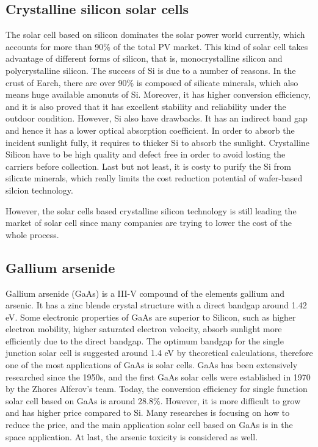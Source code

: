 \documentclass[a4paper, 12pt, titlepage,oneside,drop]{kthesis}
\begin{document}
\subsection{Crystalline silicon solar cells}
The solar cell based on silicon dominates the solar power world currently, which accounts for more than 90\% of the total PV market.
This kind of solar cell takes advantage of different forms of silicon, that is, monocrystalline silicon and polycrystalline silicon. 
The success of Si is due to a number of reasons. In the crust of Earch, there are over 90\% is composed of silicate minerals, which also means huge available amonuts of Si. Moreover, it has higher conversion efficiency, and it is also proved that 
it has excellent stability and reliability under the outdoor condition. However, Si also have drawbacks. It has an indirect band gap and hence it has a lower optical absorption coefficient. In order to absorb the incident sunlight fully, 
it requires to thicker Si to absorb the sunlight. Crystalline Silicon have to be high quality and defect free in order to avoid losting the carriers before collection. Last but not least, it is costy to purify the Si from silicate minerals, which
really limits the cost reduction potential of wafer-based silcion technology. 

However, the solar cells based crystalline silicon technology is still leading the market of solar cell since many companies are trying to lower the cost of the whole process.



\subsection{Gallium arsenide}
Gallium arsenide (GaAs) is a III-V compound of the elements gallium and arsenic. It has a zinc blende crystal structure with a direct bandgap around 1.42 eV. Some electronic properties of GaAs are superior to Silicon, such as higher electron 
mobility, higher saturated electron velocity, absorb sunlight more efficiently due to the direct bandgap. The optimum bandgap for the single junction solar cell is suggested around 1.4 eV by theoretical calculations,
therefore one of the most applications of GaAs is solar cells. GaAs has been extensively researched since the 1950s, and the first GaAs solar cells were established in 1970 by the Zhores Alferov's team. Today,
the conversion efficiency for single function solar cell based on GaAs is around 28.8\%. However, it is more difficult to grow and has higher price compared to Si. Many researches is focusing on how to reduce the price, and 
the main application solar cell based on GaAs is in the space application. At last, the arsenic toxicity is considered as well. 
\end{document}
